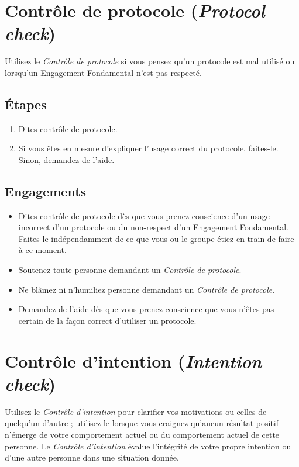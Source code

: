 \documentclass[11pt]{book}
\let\oldsection\section
\renewcommand\section{\clearpage\oldsection}
\begin{document}
\section{Contrôle de protocole (\emph{Protocol check})}

Utilisez le \emph{Contrôle de protocole} si vous pensez qu'un protocole est mal utilisé ou lorsqu'un Engagement Fondamental n'est pas
respecté.

\subsection{Étapes}
\begin{enumerate}
	\item Dites \og{}contrôle de protocole\fg{}.
	\item Si vous êtes en mesure d'expliquer l'usage correct du protocole, faites-le. Sinon, demandez de l'aide.
\end{enumerate}

\subsection{Engagements}
\begin{itemize}
	\item Dites \og{}contrôle de protocole\fg{} dès que vous prenez conscience d'un usage incorrect d'un protocole ou du non-respect
	      d'un Engagement Fondamental. Faites-le indépendamment de ce que vous ou le groupe étiez en train de faire à ce moment.
	\item Soutenez toute personne demandant un \emph{Contrôle de protocole}.
	\item Ne blâmez ni n'humiliez personne demandant un \emph{Contrôle de protocole}.
	\item Demandez de l'aide dès que vous prenez conscience que vous n'êtes pas certain de la façon correct d'utiliser un protocole.
\end{itemize}

\section{Contrôle d'intention (\emph{Intention check})}

Utilisez le \emph{Contrôle d'intention} pour clarifier vos motivations ou celles de quelqu'un d'autre ; utilisez-le lorsque vous
craignez qu'aucun résultat positif n'émerge de votre comportement actuel ou du comportement actuel de cette personne. Le
\emph{Contrôle d'intention} évalue l'intégrité de votre propre intention ou d'une autre personne dans une situation donnée.
\end{document}
